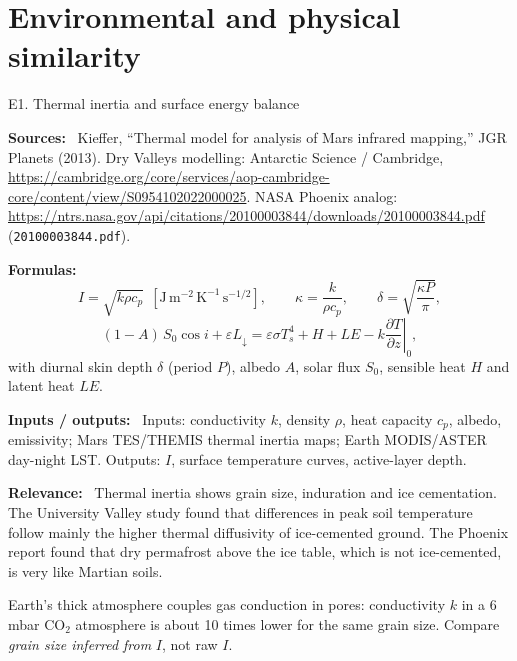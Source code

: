 \documentclass[11pt,a4paper]{article}
\newcommand{\field}[1]{\par\smallskip\textbf{\color{navy}#1:}\ }
\newcommand{\verif}[1]{\par\smallskip{\footnotesize\textit{Formula status: #1}}}
\begin{document}
\section{Environmental and physical similarity}

\begin{method}{E1. Thermal inertia and surface energy balance}
\field{Sources} Kieffer, ``Thermal model for analysis of Mars infrared mapping,'' JGR Planets (2013). Dry Valleys modelling: Antarctic Science / Cambridge, \url{https://cambridge.org/core/services/aop-cambridge-core/content/view/S0954102022000025}. NASA Phoenix analog: \url{https://ntrs.nasa.gov/api/citations/20100003844/downloads/20100003844.pdf} (\texttt{20100003844.pdf}).
\field{Formulas}
\begin{equation}
  I=\sqrt{k\rho c_p}\ \ [\mathrm{J\,m^{-2}\,K^{-1}\,s^{-1/2}}],\qquad
  \kappa=\frac{k}{\rho c_p},\qquad
  \delta=\sqrt{\frac{\kappa P}{\pi}} ,
\end{equation}
\begin{equation}
  (1-A)\,S_0\cos i + \varepsilon L_{\downarrow} = \varepsilon\sigma T_s^4 + H + LE - k\left.\frac{\partial T}{\partial z}\right|_{0},
\end{equation}
with diurnal skin depth $\delta$ (period $P$), albedo $A$, solar flux $S_0$, sensible heat $H$ and latent heat $LE$.
\field{Inputs / outputs} Inputs: conductivity $k$, density $\rho$, heat capacity $c_p$, albedo, emissivity; Mars TES/THEMIS thermal inertia maps; Earth MODIS/ASTER day-night LST. Outputs: $I$, surface temperature curves, active-layer depth.
\field{Relevance} Thermal inertia shows grain size, induration and ice cementation. The University Valley study found that differences in peak soil temperature follow mainly the higher thermal diffusivity of ice-cemented ground. The Phoenix report found that dry permafrost above the ice table, which is not ice-cemented, is very like Martian soils.
\verif{standard physics.}
\begin{caveat}Earth's thick atmosphere couples gas conduction in pores: conductivity $k$ in a 6\,mbar CO$_2$ atmosphere is about 10 times lower for the same grain size. Compare \emph{grain size inferred from} $I$, not raw $I$.\end{caveat}
\end{method}
\end{document}
